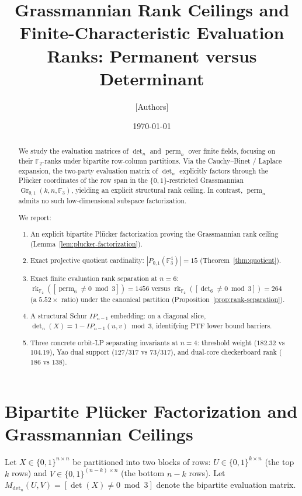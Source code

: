 \documentclass[11pt,a4paper]{amsart}
\title[Grassmannian Geometry and Modular Separation]{Grassmannian Rank Ceilings and Finite-Characteristic Evaluation Ranks: Permanent versus Determinant}
\author{[Authors]}
\date{\today}
\newcommand{\perm}{\operatorname{perm}}
\newcommand{\rkF}{\operatorname{rk}_{\mathbb{F}_2}}
\newcommand{\Gr}{\operatorname{Gr}}
\newcommand{\FF}{\mathbb{F}}
\theoremstyle{definition}
\begin{document}
\begin{abstract}
We study the evaluation matrices of $\det_n$ and $\perm_n$ over finite fields,
focusing on their $\FF_2$-ranks under bipartite row-column partitions.
Via the Cauchy--Binet / Laplace expansion, the two-party evaluation matrix of $\det_n$
explicitly factors through the Plücker coordinates of the row span in the $\{0,1\}$-restricted
Grassmannian $\Gr_{0,1}(k, n, \FF_3)$, yielding an explicit structural rank ceiling.
In contrast, $\perm_n$ admits no such low-dimensional subspace factorization.

We report:
\begin{enumerate}
  \item An explicit bipartite Plücker factorization proving the Grassmannian rank ceiling
        (Lemma~\ref{lem:plucker-factorization}).
  \item Exact projective quotient cardinality: $|P_{0,1}(\FF_3^4)| = 15$ (Theorem~\ref{thm:quotient}).
  \item Exact finite evaluation rank separation at $n = 6$:
        $\rkF([\perm_6 \ne 0 \bmod 3]) = 1456$ versus
        $\rkF([\det_6 \ne 0 \bmod 3]) = 264$ (a $5.52\times$ ratio)
        under the canonical partition (Proposition~\ref{prop:rank-separation}).
  \item A structural Schur $IP_{n-1}$ embedding: on a diagonal slice,
        $\det_n(X) = 1 - IP_{n-1}(u,v) \bmod 3$, identifying PTF lower bound barriers.
  \item Three concrete orbit-LP separating invariants at $n = 4$:
        threshold weight ($182.32$ vs $104.19$), Yao dual support ($127/317$ vs $73/317$),
        and dual-core checkerboard rank ($186$ vs $138$).
\end{enumerate}
\end{abstract}

\maketitle

\section{Bipartite Plücker Factorization and Grassmannian Ceilings}

Let $X \in \{0,1\}^{n \times n}$ be partitioned into two blocks of rows:
$U \in \{0,1\}^{k \times n}$ (the top $k$ rows) and $V \in \{0,1\}^{(n-k) \times n}$ (the bottom $n-k$ rows).
Let $M_{\det_n}(U, V) = [\det(X) \ne 0 \bmod 3]$ denote the bipartite evaluation matrix.
\end{document}
